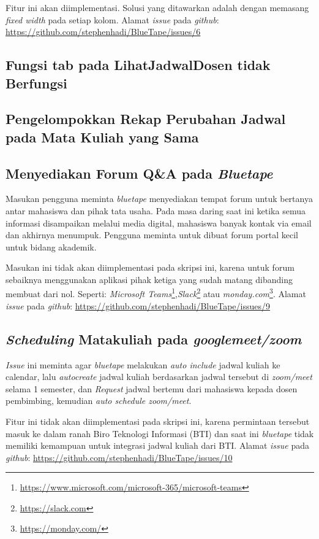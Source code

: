 Fitur ini akan diimplementasi. Solusi yang ditawarkan adalah dengan memasang \textit{fixed width} pada setiap kolom. Alamat \textit{issue} pada \textit{github}: \url{https://github.com/stephenhadi/BlueTape/issues/6} 

\subsection{Fungsi tab pada LihatJadwalDosen tidak Berfungsi}
\label{issue:7}
\subsection{Pengelompokkan Rekap Perubahan Jadwal pada Mata Kuliah yang Sama}
\label{issue:8}
\subsection{Menyediakan Forum Q\&A pada \textit{Bluetape}}
\label{issue:9}
Masukan pengguna meminta \textit{bluetape} menyediakan tempat forum untuk bertanya antar mahasiswa dan pihak tata usaha. Pada masa daring saat ini ketika semua informasi disampaikan melalui media digital, mahasiswa banyak kontak via email dan akhirnya menumpuk. Pengguna meminta untuk dibuat forum portal kecil untuk bidang akademik.

Masukan ini tidak akan diimplementasi pada skripsi ini, karena untuk forum sebaiknya menggunakan aplikasi pihak ketiga yang sudah matang dibanding membuat dari nol. Seperti: \textit{Microsoft Teams}\footnote{\url{https://www.microsoft.com/microsoft-365/microsoft-teams}},\textit{Slack}\footnote{\url{https://slack.com}} atau \textit{monday.com}\footnote{\url{https://monday.com/}}. Alamat \textit{issue} pada \textit{github}: \url{https://github.com/stephenhadi/BlueTape/issues/9} 

\subsection{\textit{Scheduling} Matakuliah pada \textit{googlemeet/zoom}}
\label{issue:10}
\textit{Issue} ini meminta agar \textit{bluetape} melakukan \textit{auto include} jadwal kuliah ke calendar, lalu \textit{autocreate} jadwal kuliah berdasarkan jadwal tersebut di \textit{zoom/meet} selama 1 semester, dan \textit{Request} jadwal bertemu dari mahasiswa kepada dosen pembimbing, kemudian \textit{auto schedule zoom/meet}.

Fitur ini tidak akan diimplementasi pada skripsi ini, karena permintaan tersebut masuk ke dalam ranah Biro Teknologi Informasi (BTI) dan saat ini \textit{bluetape} tidak memiliki kemampuan untuk integrasi jadwal kuliah dari BTI. Alamat \textit{issue} pada \textit{github}: \url{https://github.com/stephenhadi/BlueTape/issues/10} 

